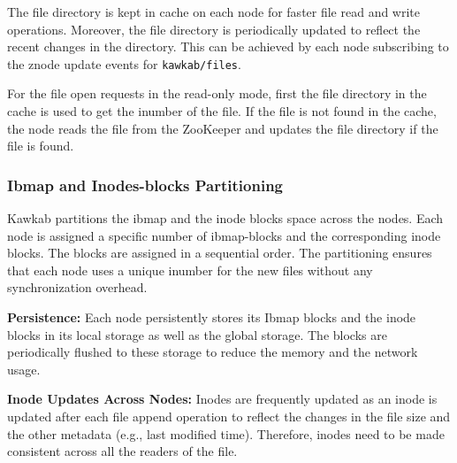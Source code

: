 \documentclass[]{article}
\newcommand{\subtopic}[1]{\vspace{1.5pt} \noindent \textbf{#1}}
\newcommand{\hl}[1]{\textcolor{hlcolor}{#1}}
\begin{document}
The file directory is kept in cache on each node for faster file read and write
operations. Moreover, the file directory is periodically updated to reflect the
recent changes in the directory. This can be achieved by each node subscribing
to the znode update events for \texttt{kawkab/files}.

For the file open requests in the read-only mode, first the file directory in
the cache is used to get the inumber of the file. If the file is not found in
the cache, the node reads the file from the ZooKeeper and updates the file
directory if the file is found.



\subsubsection{Ibmap and Inodes-blocks Partitioning} Kawkab partitions the ibmap
and the inode blocks space across the nodes. Each node is assigned a specific
number of ibmap-blocks and the corresponding inode blocks.
The blocks are assigned in a sequential order. The partitioning ensures that
each node uses a unique inumber for the new files without any synchronization
overhead.

\subtopic{Persistence:} Each node persistently stores its Ibmap blocks and the
inode blocks in its local storage as well as the global storage. The blocks are
periodically flushed to these storage to reduce the memory and the network usage.

\subtopic{Inode Updates Across Nodes:} Inodes are frequently updated as an inode is
updated after each file append operation to reflect the changes in the file
size and the other metadata (e.g., last modified time).  Therefore, inodes need
to be made consistent across all the readers of the file.


\end{document}
